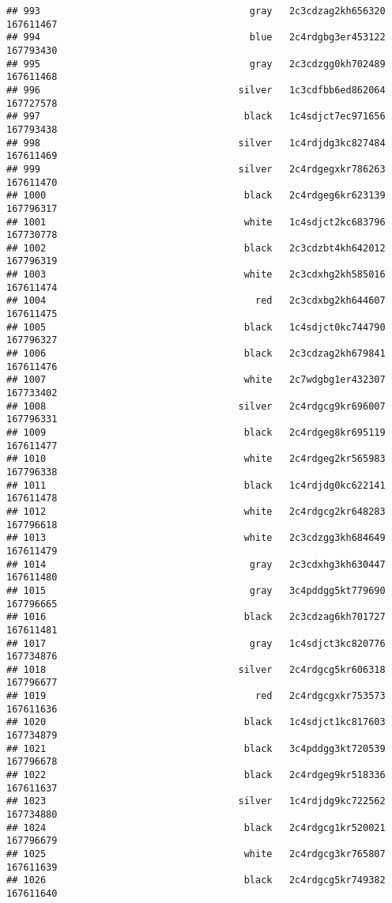 \documentclass[
]{article}
\begin{document}
\begin{verbatim}
## 993                                     gray   2c3cdzag2kh656320 167611467
## 994                                     blue   2c4rdgbg3er453122 167793430
## 995                                     gray   2c3cdzgg0kh702489 167611468
## 996                                   silver   1c3cdfbb6ed862064 167727578
## 997                                    black   1c4sdjct7ec971656 167793438
## 998                                   silver   1c4rdjdg3kc827484 167611469
## 999                                   silver   2c4rdgegxkr786263 167611470
## 1000                                   black   2c4rdgeg6kr623139 167796317
## 1001                                   white   1c4sdjct2kc683796 167730778
## 1002                                   black   2c3cdzbt4kh642012 167796319
## 1003                                   white   2c3cdxhg2kh585016 167611474
## 1004                                     red   2c3cdxbg2kh644607 167611475
## 1005                                   black   1c4sdjct0kc744790 167796327
## 1006                                   black   2c3cdzag2kh679841 167611476
## 1007                                   white   2c7wdgbg1er432307 167733402
## 1008                                  silver   2c4rdgcg9kr696007 167796331
## 1009                                   black   2c4rdgeg8kr695119 167611477
## 1010                                   white   2c4rdgeg2kr565983 167796338
## 1011                                   black   1c4rdjdg0kc622141 167611478
## 1012                                   white   2c4rdgcg2kr648283 167796618
## 1013                                   white   2c3cdzgg3kh684649 167611479
## 1014                                    gray   2c3cdxhg3kh630447 167611480
## 1015                                    gray   3c4pddgg5kt779690 167796665
## 1016                                   black   2c3cdzag6kh701727 167611481
## 1017                                    gray   1c4sdjct3kc820776 167734876
## 1018                                  silver   2c4rdgcg5kr606318 167796677
## 1019                                     red   2c4rdgcgxkr753573 167611636
## 1020                                   black   1c4sdjct1kc817603 167734879
## 1021                                   black   3c4pddgg3kt720539 167796678
## 1022                                   black   2c4rdgeg9kr518336 167611637
## 1023                                  silver   1c4rdjdg9kc722562 167734880
## 1024                                   black   2c4rdgcg1kr520021 167796679
## 1025                                   white   2c4rdgcg3kr765807 167611639
## 1026                                   black   2c4rdgcg5kr749382 167611640

\end{verbatim}
\end{document}
